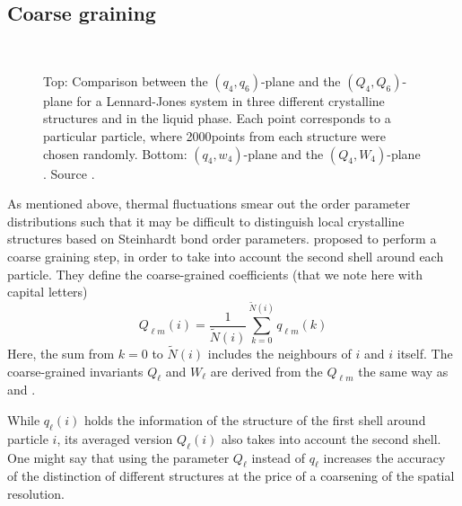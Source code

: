 \subsection{Coarse graining}
\label{sec:cgBOO}

\begin{figure}
	\centering
	\quad
	\\
	\quad
	\caption{Top: Comparison between the $(q_4,q_6)$-plane  and the $(Q_4,Q_6)$-plane  for a Lennard-Jones system in three different crystalline structures and in the liquid phase. Each point corresponds to a particular particle, where \unit{2000}{points} from each structure were chosen randomly. Bottom: $(q_4,w_4)$-plane  and the $(Q_4,W_4)$-plane . Source .}
	\label{fig:invariants_maps}
\end{figure}

As mentioned above, thermal fluctuations smear out the order parameter distributions such that it may be difficult to distinguish local crystalline structures based on Steinhardt bond order parameters. \citet{lechner:114707} proposed to perform a coarse graining step, in order to take into account the second shell around each particle. They define the coarse-grained coefficients (that we note here with capital letters)
\begin{equation}
	Q_{\ell m}(i) = \frac{1}{\tilde{N} (i)} \sum_{k=0}^{\tilde{N}(i)} q_{\ell m}(k)
\end{equation}
Here, the sum from $k=0$ to $\tilde{N}(i)$ includes the neighbours of $i$ and $i$ itself. The coarse-grained invariants $Q_\ell$ and $W_\ell$ are derived from the $Q_{\ell m}$ the same way as  and .

While $q_\ell(i)$ holds the information of the structure of the first shell around particle $i$, its averaged version $Q_\ell(i)$ also takes into account the second shell. One might say that using the parameter $Q_\ell$ instead of $q_\ell$ increases the accuracy of the distinction of different structures at the price of a coarsening of the spatial resolution.

